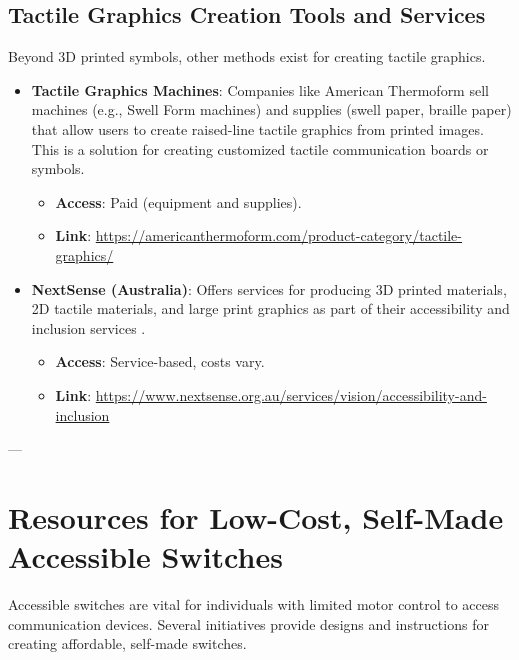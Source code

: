 \subsection{Tactile Graphics Creation Tools and Services}
Beyond 3D printed symbols, other methods exist for creating tactile graphics.
\begin{itemize}
    \item \textbf{Tactile Graphics Machines}: Companies like American Thermoform sell machines (e.g., Swell Form machines) and supplies (swell paper, braille paper) that allow users to create raised-line tactile graphics from printed images. This is a solution for creating customized tactile communication boards or symbols.
    \begin{itemize}
        \item \textbf{Access}: Paid (equipment and supplies).
        \item \textbf{Link}: \url{https://americanthermoform.com/product-category/tactile-graphics/}
    \end{itemize}
    \item \textbf{NextSense (Australia)}: Offers services for producing 3D printed materials, 2D tactile materials, and large print graphics as part of their accessibility and inclusion services  \cite{NextSense_Services}.
    \begin{itemize}
        \item \textbf{Access}: Service-based, costs vary.
        \item \textbf{Link}: \url{https://www.nextsense.org.au/services/vision/accessibility-and-inclusion}
    \end{itemize}
\end{itemize}

---

\section{Resources for Low-Cost, Self-Made Accessible Switches}
Accessible switches are vital for individuals with limited motor control to access communication devices. Several initiatives provide designs and instructions for creating affordable, self-made switches.

